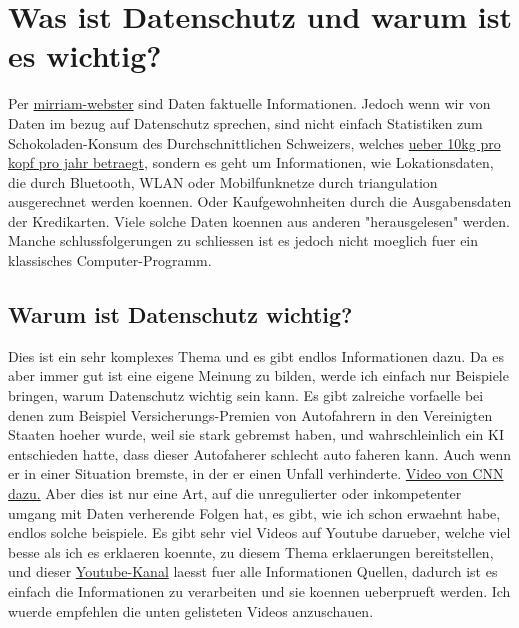 \documentclass{report}
\begin{document}
\section{Was ist Datenschutz und warum ist es wichtig?}
Per \hyperlink{https://www.merriam-webster.com/dictionary/data}{mirriam-webster} sind Daten faktuelle Informationen.
Jedoch wenn wir von Daten im bezug auf Datenschutz sprechen, sind nicht einfach Statistiken zum Schokoladen-Konsum des Durchschnittlichen Schweizers, welches \hyperlink{https://de.statista.com/statistik/daten/studie/369440/umfrage/pro-kopf-konsum-von-schokolade-in-der-schweiz/}{ueber 10kg pro kopf pro jahr betraegt},
sondern es geht um Informationen, wie Lokationsdaten, die durch Bluetooth, WLAN oder Mobilfunknetze durch triangulation ausgerechnet werden koennen. Oder Kaufgewohnheiten durch die Ausgabensdaten der Kredikarten.
Viele solche Daten koennen aus anderen "herausgelesen" werden. Manche schlussfolgerungen zu schliessen ist es jedoch nicht moeglich fuer ein klassisches Computer-Programm.
\subsection{Warum ist Datenschutz wichtig?}
Dies ist ein sehr komplexes Thema und es gibt endlos Informationen dazu. Da es aber immer gut ist eine eigene Meinung zu bilden, werde ich einfach nur Beispiele bringen, warum Datenschutz wichtig sein kann.
\newline
Es gibt zalreiche vorfaelle bei denen zum Beispiel Versicherungs-Premien von Autofahrern in den Vereinigten Staaten hoeher wurde, weil sie stark gebremst haben, und wahrschleinlich ein KI entschieden hatte, dass dieser Autofaherer schlecht auto faheren kann. Auch wenn er in einer Situation bremste, in der er einen Unfall verhinderte.
\hyperlink{https://youtube.com/watch?v=aHhx8mMUV2o}{Video von CNN dazu.}
\newline
Aber dies ist nur eine Art, auf die unregulierter oder inkompetenter umgang mit Daten verherende Folgen hat, es gibt, wie ich schon erwaehnt habe, endlos solche beispiele.
\newline
Es gibt sehr viel Videos auf Youtube darueber, welche viel besse als ich es erklaeren koennte, zu diesem Thema erklaerungen bereitstellen, und dieser \hyperlink{https://youtube.com/channel/UCjr2bPAyPV7t35MvcgT3W8Q}{Youtube-Kanal} laesst fuer alle Informationen Quellen, dadurch ist es einfach die Informationen zu verarbeiten und sie koennen ueberprueft werden.
Ich wuerde empfehlen die unten gelisteten Videos anzuschauen.
\end{document}

